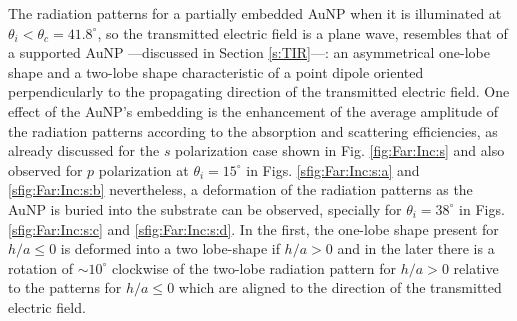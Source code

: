 The radiation patterns for a partially embedded AuNP when it is illuminated at $\theta_i < \theta_c = 41.8^\circ$, so the transmitted electric field is a plane wave,  resembles  that of a supported AuNP ---discussed in Section \ref{s:TIR}---: an asymmetrical one-lobe shape and a two-lobe shape characteristic of a point dipole oriented perpendicularly to the propagating direction of the transmitted electric field. One effect of the AuNP's embedding is the enhancement of the average amplitude of the radiation patterns according to the absorption and scattering efficiencies, as already discussed for the $s$ polarization case shown in Fig. \ref{fig:Far:Inc:s} and also observed  for $p$ polarization at $\theta_i = 15^\circ$ in Figs. \ref{sfig:Far:Inc:s:a} and \ref{sfig:Far:Inc:s:b} nevertheless, a deformation of the radiation patterns as the AuNP is buried into the substrate can be observed, specially for $\theta_i = 38^\circ$ in Figs. \ref{sfig:Far:Inc:s:c} and \ref{sfig:Far:Inc:s:d}. In the first, the one-lobe shape present for $h/a\leq 0$ is deformed into a two lobe-shape if $h/a>0$  and in the later there is a rotation of $\sim 10^\circ$ clockwise of the two-lobe radiation pattern for $h/a>0$ relative to the patterns for $h/a\leq0$ which are aligned to the direction of the transmitted electric field.

